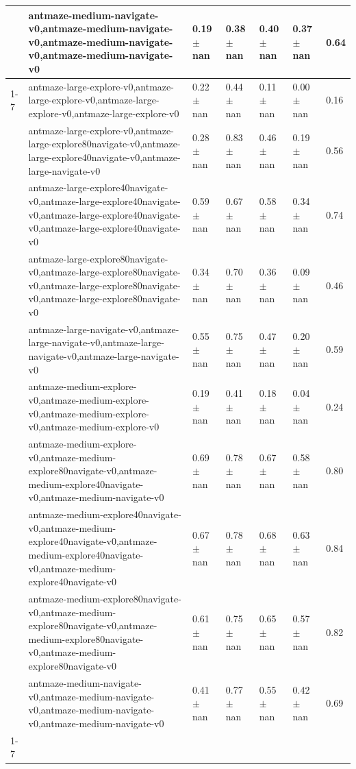 \begin{tabular}{lllllll}
 & antmaze-medium-navigate-v0,antmaze-medium-navigate-v0,antmaze-medium-navigate-v0,antmaze-medium-navigate-v0 & 0.19 $\pm$ nan & 0.38 $\pm$ nan & 0.40 $\pm$ nan & 0.37 $\pm$ nan & 0.64 \\
\cline{1-7}
\multirow[t]{10}{*}{QRL} & antmaze-large-explore-v0,antmaze-large-explore-v0,antmaze-large-explore-v0,antmaze-large-explore-v0 & 0.22 $\pm$ nan & 0.44 $\pm$ nan & 0.11 $\pm$ nan & 0.00 $\pm$ nan & 0.16 \\
 & antmaze-large-explore-v0,antmaze-large-explore80navigate-v0,antmaze-large-explore40navigate-v0,antmaze-large-navigate-v0 & 0.28 $\pm$ nan & 0.83 $\pm$ nan & 0.46 $\pm$ nan & 0.19 $\pm$ nan & 0.56 \\
 & antmaze-large-explore40navigate-v0,antmaze-large-explore40navigate-v0,antmaze-large-explore40navigate-v0,antmaze-large-explore40navigate-v0 & 0.59 $\pm$ nan & 0.67 $\pm$ nan & 0.58 $\pm$ nan & 0.34 $\pm$ nan & 0.74 \\
 & antmaze-large-explore80navigate-v0,antmaze-large-explore80navigate-v0,antmaze-large-explore80navigate-v0,antmaze-large-explore80navigate-v0 & 0.34 $\pm$ nan & 0.70 $\pm$ nan & 0.36 $\pm$ nan & 0.09 $\pm$ nan & 0.46 \\
 & antmaze-large-navigate-v0,antmaze-large-navigate-v0,antmaze-large-navigate-v0,antmaze-large-navigate-v0 & 0.55 $\pm$ nan & 0.75 $\pm$ nan & 0.47 $\pm$ nan & 0.20 $\pm$ nan & 0.59 \\
 & antmaze-medium-explore-v0,antmaze-medium-explore-v0,antmaze-medium-explore-v0,antmaze-medium-explore-v0 & 0.19 $\pm$ nan & 0.41 $\pm$ nan & 0.18 $\pm$ nan & 0.04 $\pm$ nan & 0.24 \\
 & antmaze-medium-explore-v0,antmaze-medium-explore80navigate-v0,antmaze-medium-explore40navigate-v0,antmaze-medium-navigate-v0 & 0.69 $\pm$ nan & 0.78 $\pm$ nan & 0.67 $\pm$ nan & 0.58 $\pm$ nan & 0.80 \\
 & antmaze-medium-explore40navigate-v0,antmaze-medium-explore40navigate-v0,antmaze-medium-explore40navigate-v0,antmaze-medium-explore40navigate-v0 & 0.67 $\pm$ nan & 0.78 $\pm$ nan & 0.68 $\pm$ nan & 0.63 $\pm$ nan & 0.84 \\
 & antmaze-medium-explore80navigate-v0,antmaze-medium-explore80navigate-v0,antmaze-medium-explore80navigate-v0,antmaze-medium-explore80navigate-v0 & 0.61 $\pm$ nan & 0.75 $\pm$ nan & 0.65 $\pm$ nan & 0.57 $\pm$ nan & 0.82 \\
 & antmaze-medium-navigate-v0,antmaze-medium-navigate-v0,antmaze-medium-navigate-v0,antmaze-medium-navigate-v0 & 0.41 $\pm$ nan & 0.77 $\pm$ nan & 0.55 $\pm$ nan & 0.42 $\pm$ nan & 0.69 \\
\cline{1-7}
\bottomrule
\end{tabular}

